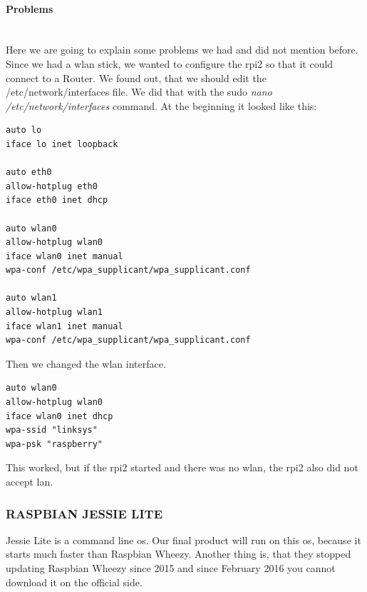 \paragraph{Problems} \mbox{}\\
Here we are going to explain some problems we had and did not mention before.\newline
Since we had a \gls{wlan} stick, we wanted to configure the \gls{rpi2} so that it could connect to a Router. We found out, that we should edit the /etc/network/interfaces file. We did that with the sudo \textit{nano /etc/network/interfaces} command.\newline
At the beginning it looked like this:
\begin{verbatim}
auto lo
iface lo inet loopback

auto eth0
allow-hotplug eth0
iface eth0 inet dhcp

auto wlan0
allow-hotplug wlan0
iface wlan0 inet manual
wpa-conf /etc/wpa_supplicant/wpa_supplicant.conf

auto wlan1
allow-hotplug wlan1
iface wlan1 inet manual
wpa-conf /etc/wpa_supplicant/wpa_supplicant.conf
\end{verbatim}
Then we changed the \gls{wlan} interface.
\begin{verbatim}
auto wlan0
allow-hotplug wlan0
iface wlan0 inet dhcp
wpa-ssid "linksys"
wpa-psk "raspberry"
\end{verbatim}
This worked, but  if the \gls{rpi2} started and there was no \gls{wlan}, the \gls{rpi2} also did not accept \gls{lan}.
\newpage
\subsubsection{RASPBIAN JESSIE LITE}
Jessie Lite is a command line \gls{os}. Our final product will run on this \gls{os}, because it starts much faster than Raspbian Wheezy. Another thing is, that they stopped updating Raspbian Wheezy since 2015 and since February 2016 you cannot download it on the official side.
